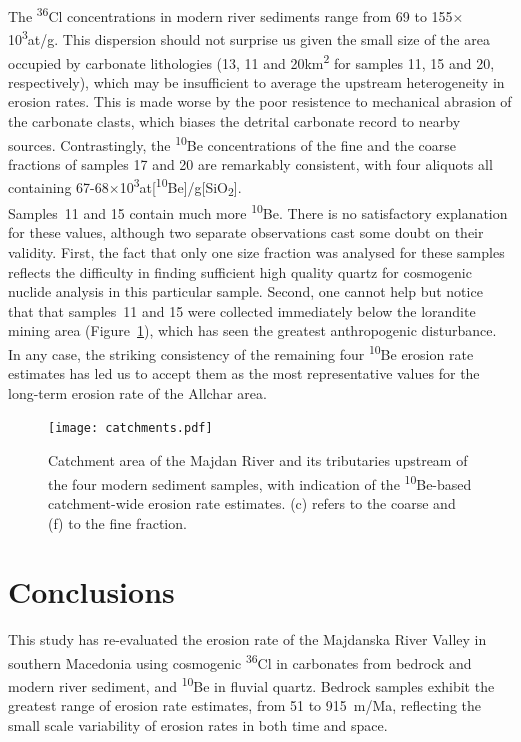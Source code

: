 \documentclass[titlepage]{article}
\begin{document}
The \textsuperscript{36}Cl concentrations in modern river sediments
range from 69 to 155$\times$10\textsuperscript{3}at/g. This dispersion
should not surprise us given the small size of the area occupied by
carbonate lithologies (13, 11 and 20km\textsuperscript{2} for samples
11, 15 and 20, respectively), which may be insufficient to average the
upstream heterogeneity in erosion rates. This is made worse by the
poor resistence to mechanical abrasion of the carbonate clasts, which
biases the detrital carbonate record to nearby sources.
Contrastingly, the \textsuperscript{10}Be concentrations of the fine
and the coarse fractions of samples 17 and 20 are remarkably
consistent, with four aliquots all containing
67-68$\times$10\textsuperscript{3}at[\textsuperscript{10}Be]/g[SiO\textsubscript{2}].\\

Samples~11 and 15 contain much more \textsuperscript{10}Be. There is
no satisfactory explanation for these values, although two separate
observations cast some doubt on their validity. First, the fact that
only one size fraction was analysed for these samples reflects the
difficulty in finding sufficient high quality quartz for cosmogenic
nuclide analysis in this particular sample. Second, one cannot help
but notice that that samples~11 and 15 were collected immediately
below the lorandite mining area (Figure~\ref{fig:catchments}), which
has seen the greatest anthropogenic disturbance.  In any case, the
striking consistency of the remaining four \textsuperscript{10}Be
erosion rate estimates has led us to accept them as the most
representative values for the long-term erosion rate of the Allchar
area.

\begin{figure}[!ht]
  \centering
  \texttt{[image: catchments.pdf]}
  \caption{Catchment area of the Majdan River and its tributaries
    upstream of the four modern sediment samples, with indication of
    the \textsuperscript{10}Be-based catchment-wide erosion rate
    estimates. (c) refers to the coarse and (f) to the fine fraction.}
  \label{fig:catchments}
\end{figure}

\section{Conclusions}
\label{sec:conclusion}

This study has re-evaluated the erosion rate of the Majdanska River
Valley in southern Macedonia using cosmogenic \textsuperscript{36}Cl
in carbonates from bedrock and modern river sediment, and
\textsuperscript{10}Be in fluvial quartz.  Bedrock samples exhibit the
greatest range of erosion rate estimates, from 51 to 915~m/Ma,
reflecting the small scale variability of erosion rates in both time
and space.\\
\end{document}
